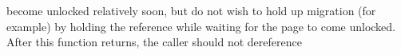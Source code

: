 become unlocked relatively soon, but do not wish to hold up migration (for example) by holding the reference while waiting for the page to come unlocked. After this function returns, the caller should not dereference 